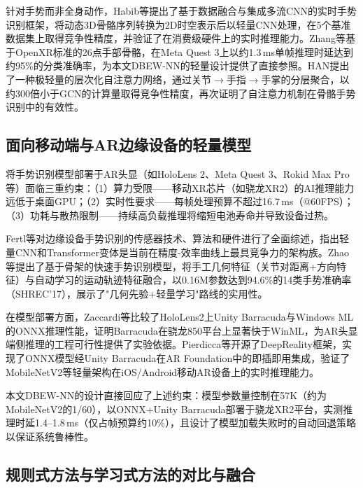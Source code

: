 针对手势而非全身动作，Habib等\cite{habib2025skeleton_hgr}提出了基于数据融合与集成多流CNN的实时手势识别框架，将动态3D骨骼序列转换为2D时空表示后以轻量CNN处理，在5个基准数据集上取得竞争性精度，并验证了在消费级硬件上的实时推理能力。Zhang等\cite{openxr2025gesture}基于OpenXR标准的26点手部骨骼，在Meta Quest 3上以约1.3\,ms单帧推理时延达到约95\%的分类准确率，为本文DBEW-NN的轻量设计提供了直接参照。HAN\cite{han2025hierarchical_attention}提出了一种极轻量的层次化自注意力网络，通过关节$\rightarrow$手指$\rightarrow$手掌的分层聚合，以约300倍小于GCN的计算量取得竞争性精度，再次证明了自注意力机制在骨骼手势识别中的有效性。

\subsection{面向移动端与AR边缘设备的轻量模型}

将手势识别模型部署于AR头显（如HoloLens 2、Meta Quest 3、Rokid Max Pro等）面临三重约束：（1）算力受限——移动XR芯片（如骁龙XR2）的AI推理能力远低于桌面GPU；（2）实时性要求——每帧处理预算不超过16.7\,ms（@60FPS）；（3）功耗与散热限制——持续高负载推理将缩短电池寿命并导致设备过热。

Fertl等\cite{fertl2025hgr_edge_survey}对边缘设备手势识别的传感器技术、算法和硬件进行了全面综述，指出轻量CNN和Transformer变体是当前在精度-效率曲线上最具竞争力的架构族。Zhao等\cite{zhao2022fast_skeleton_hgr}提出了基于骨架的快速手势识别模型，将手工几何特征（关节对距离+方向特征）与自动学习的运动轨迹特征融合，以0.16M参数达到94.6\%的14类手势准确率（SHREC'17），展示了"几何先验+轻量学习"路线的实用性。

在模型部署方面，Zaccardi等\cite{zaccardi2023hololens_barracuda}比较了HoloLens2上Unity Barracuda与Windows ML的ONNX推理性能，证明Barracuda在骁龙850平台上显著快于WinML，为AR头显端侧推理的工程可行性提供了实验依据。Pierdicca等\cite{pierdicca2024deepreality}开源了DeepReality框架，实现了ONNX模型经Unity Barracuda在AR Foundation中的即插即用集成，验证了MobileNetV2等轻量架构在iOS/Android移动AR设备上的实时推理能力。

本文DBEW-NN的设计直接回应了上述约束：模型参数量控制在57K（约为MobileNetV2的1/60），以ONNX+Unity Barracuda部署于骁龙XR2平台，实测推理时延1.4--1.8\,ms（仅占帧预算约10\%），且设计了模型加载失败时的自动回退策略以保证系统鲁棒性。

\subsection{规则式方法与学习式方法的对比与融合}

